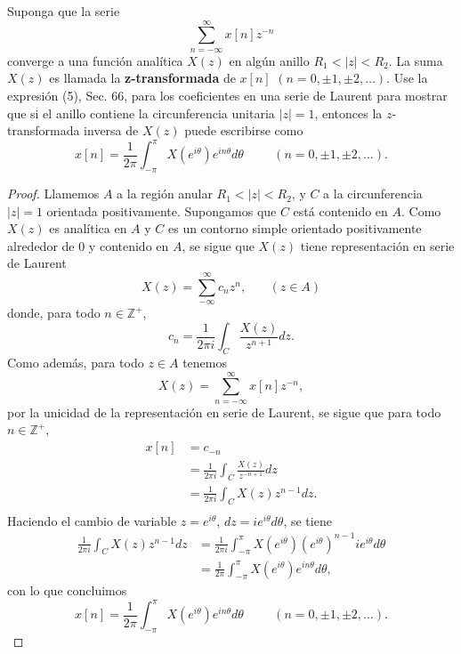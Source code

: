 \begin{Ejc}
    Suponga que la serie
    $$
    \sum_{n=-\infty}^{\infty} x[n]z^{-n}
    $$
    converge a una función analítica $X(z)$ en algún anillo $R_1<|z|<R_2$. La suma $X(z)$ es llamada la \textbf{z-transformada} de $x[n]$ $(n=0,\pm 1,\pm 2,\dots)$. Use la expresión (5), Sec. 66, para los coeficientes en una serie de Laurent para mostrar que si el anillo contiene la circunferencia unitaria $|z|=1$, entonces la $z$-transformada inversa de $X(z)$ puede escribirse como
    $$
    x[n]=\frac{1}{2\pi}\int_{-\pi}^{\pi} X(e^{i\theta})e^{in\theta}d\theta\hspace{1cm}(n=0,\pm 1, \pm 2,\dots).
    $$
\end{Ejc}
\begin{proof}
    Llamemos $A$ a la región anular $R_1<|z|<R_2$, y $C$ a la circunferencia $|z|=1$ orientada positivamente. Supongamos que $C$ está contenido en $A$. Como $X(z)$ es analítica en $A$ y $C$ es un contorno simple orientado positivamente alrededor de $0$ y contenido en $A$, se sigue que $X(z)$ tiene representación en serie de Laurent
    $$
    X(z)=\sum_{-\infty}^{\infty} c_n z^n, \phantom{1cm}(z\in A)
    $$
    donde, para todo $n\in \mathbb{Z}^{+}$,
    $$
    c_n=\frac{1}{2\pi i}\int_{C}\frac{X(z)}{z^{n+1}} dz.
    $$
    Como además, para todo $z\in A$ tenemos
    $$
    X(z)=\sum_{n=-\infty}^{\infty} x[n]z^{-n},
    $$
    por la unicidad de la representación en serie de Laurent, se sigue que para todo $n\in \mathbb{Z}^{+}$,
    $$
    \begin{aligned}
       x[n]&=c_{-n}\\
           &=\frac{1}{2\pi i}\int_{C}\frac{X(z)}{z^{-n+1}} dz\\
           &=\frac{1}{2\pi i}\int_{C}X(z)z^{n-1}dz.\\
    \end{aligned}
    $$
    Haciendo el cambio de variable $z=e^{i\theta}$, $dz=ie^{i\theta}d\theta$, se tiene
    $$
    \begin{aligned}
       \frac{1}{2\pi i}\int_{C}X(z)z^{n-1}dz&=\frac{1}{2\pi i}\int_{-\pi}^{\pi}X(e^{i\theta})({e^{i\theta}})^{n-1}ie^{i\theta}d\theta\\
                                            &=\frac{1}{2\pi}\int_{-\pi}^{\pi} X(e^{i\theta})e^{in\theta}d\theta,
    \end{aligned}
    $$
    con lo que concluimos
    $$
    x[n]=\frac{1}{2\pi}\int_{-\pi}^{\pi} X(e^{i\theta})e^{in\theta}d\theta\hspace{1cm}(n=0,\pm 1, \pm 2,\dots).
    $$
\end{proof}
